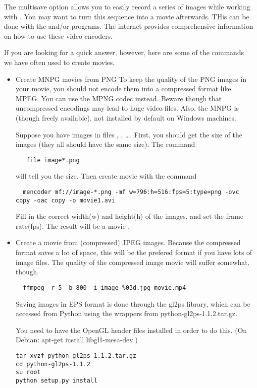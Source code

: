 \begin{enumerate}
The multisave option allows you to easily record a series of images while working with \pyformex. You may want to turn this sequence into a movie afterwards. THis can be done with the  and/or  programs. The internet provides comprehensive information on how to use these video encoders. 

If you are looking for a quick answer, however, here are some of the commands we have often used to create movies.
\begin{itemize}
\item Create MNPG movies from PNG
To keep the quality of the PNG images in your movie, you should not encode them into a compressed format like MPEG. You can use the MPNG codec instead. Beware though that uncompressed encodings may lead to huge video files. Also, the MNPG is (though freely available), not installed by default on Windows machines.

Suppose you have images in files , , \dots.
First, you should get the size of the images (they all should have the same size). The command 
\begin{verbatim}
   file image*.png
\end{verbatim}
 will tell you the size. Then create movie with the command
\begin{verbatim}
  mencoder mf://image-*.png -mf w=796:h=516:fps=5:type=png -ovc copy -oac copy -o movie1.avi
\end{verbatim}
Fill in the correct width(w) and height(h) of the images, and set the frame rate(fps). The result will be a movie .


\item Create a movie from (compressed) JPEG images.
Because the compressed format saves a lot of space, this will be the prefered format if you have lots of image files. The quality of the compressed image movie will suffer somewhat, though.
\begin{verbatim}
  ffmpeg -r 5 -b 800 -i image-%03d.jpg movie.mp4
\end{verbatim}


Saving images in EPS format is done through the gl2ps library, which can be accessed from Python using the wrappers from python-gl2ps-1.1.2.tar.gz.

You need to have the OpenGL header files installed in order to do this. (On Debian: apt-get install libgl1-mesa-dev.)

\begin{verbatim}
tar xvzf python-gl2ps-1.1.2.tar.gz
cd python-gl2ps-1.1.2
su root
python setup.py install
\end{verbatim}

\end{itemize}
\end{enumerate}


